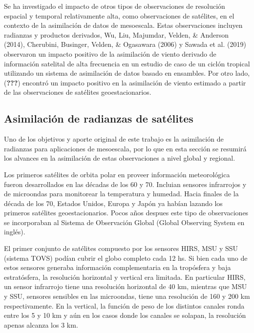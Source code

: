 \documentclass[12pt,twoside]{reedthesis}
\begin{document}
Se ha investigado el impacto de otros tipos de observaciones de resolución espacial y temporal relativamente alta, como observaciones de satélites, en el contexto de la asimilación de datos de mesoescala. Estas observaciones incluyen radianzas y productos derivados, Wu, Liu, Majumdar, Velden, \& Anderson (2014), Cherubini, Businger, Velden, \& Ogasawara (2006) y Sawada et al. (2019) observaron un impacto positivo de la asimilación de viento derivado de información satelital de alta frecuencia en un estudio de caso de un ciclón tropical utilizando un sistema de asimilación de datos basado en ensambles. Por otro lado, ({\textbf{???}}) encontró un impacto positivo en la asimilación de viento estimado a partir de las observaciones de satélites geoestacionarios.

\hypertarget{asimilaciuxf3n-de-radianzas-de-satuxe9lites}{%
\subsection{Asimilación de radianzas de satélites}\label{asimilaciuxf3n-de-radianzas-de-satuxe9lites}}

Uno de los objetivos y aporte original de este trabajo es la asimilación de radianzas para aplicaciones de mesoescala, por lo que en esta sección se resumirá los alvances en la asimilación de estas observaciones a nivel global y regional.

Los primeros satélites de orbita polar en proveer información meteorológica fueron desarrollados en las décadas de los 60 y 70. Incluian sensores infrarrojos y de microondas para monitorear la temperatura y humedad. Hacia finales de la década de los 70, Estados Unidos, Europa y Japón ya habían lazando los primeros satélites geoestacionarios. Pocos años despues este tipo de observaciones se incorporaban al Sistema de Observación Global (Global Observing System en inglés).

El primer conjunto de satélites compuesto por los sensores HIRS, MSU y SSU (sistema TOVS) podían cubrir el globo completo cada 12 hs. Si bien cada uno de estos sensores generaba información complementaria en la tropósfera y baja estratósfera, la resolución horizontal y vertical era limitada. En particular HIRS, un sensor infrarrojo tiene una resolución horizontal de 40 km, mientras que MSU y SSU, sensores sensibles en las microondas, tiene una resolución de 160 y 200 km respectivamente. En la vertical, la función de peso de los distintos canales ronda entre los 5 y 10 km y aún en los casos donde los canales se solapan, la resolución apenas alcanza los 3 km.
\end{document}
